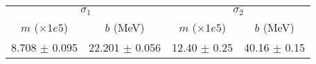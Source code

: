 \begin{tabular}{cc|cc}
\multicolumn{2}{c|}{$\sigma_1$} & \multicolumn{2}{|c}{$\sigma_2$} \\
$m$ ($\times1e5$) & $b$ (MeV) & $m$ ($\times1e5$) & $b$ (MeV) \\
\hline
8.708 $\pm$ 0.095 & 22.201 $\pm$ 0.056 & 12.40 $\pm$ 0.25 & 40.16 $\pm$ 0.15\\
\end{tabular}
